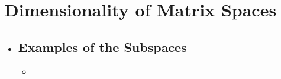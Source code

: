 \section{Dimensionality of Matrix Spaces}\label{Dimensionality of Matrix Spaces}
\begin{itemize}
  \item []
  
  \subsection{Examples of the Subspaces}\label{Examples of the Subspaces}
  \begin{itemize}
    \item 
  \end{itemize}
  
\end{itemize}
